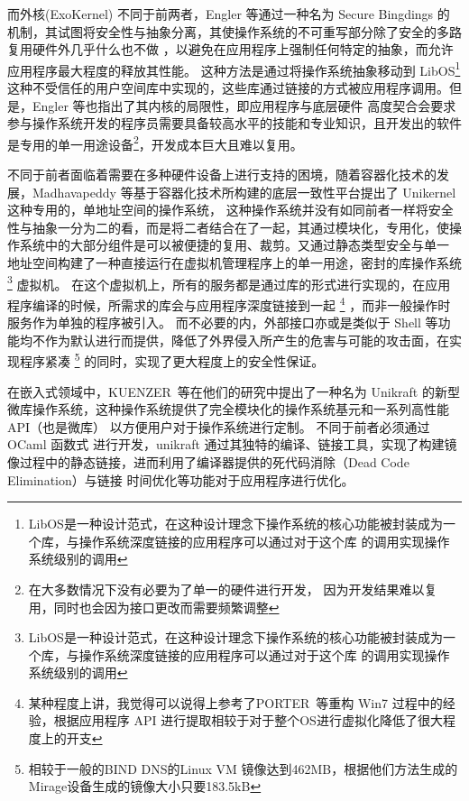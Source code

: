     而外核(ExoKernel) 不同于前两者，Engler 等通过一种名为 Secure Bingdings 的机制，其试图将安全性与抽象分离，其使操作系统的不可重写部分除了安全的多路复用硬件外几乎什么也不做
    ，以避免在应用程序上强制任何特定的抽象，而允许应用程序最大程度的释放其性能。
    这种方法是通过将操作系统抽象移动到 LibOS\footnote{LibOS是一种设计范式，在这种设计理念下操作系统的核心功能被封装成为一个库，与操作系统深度链接的应用程序可以通过对于这个库
    的调用实现操作系统级别的调用}
     这种不受信任的用户空间库中实现的，这些库通过链接的方式被应用程序调用。但是，Engler 等也指出了其内核的局限性，即应用程序与底层硬件
    高度契合会要求参与操作系统开发的程序员需要具备较高水平的技能和专业知识，且开发出的软件是专用的单一用途设备\footnote{在大多数情况下没有必要为了单一的硬件进行开发，
    因为开发结果难以复用，同时也会因为接口更改而需要频繁调整}，开发成本巨大且难以复用。
    \cite{wikiosdev_exokernel, engler_exokernel_1998}

    不同于前者面临着需要在多种硬件设备上进行支持的困境，随着容器化技术的发展，Madhavapeddy 等基于容器化技术所构建的底层一致性平台提出了 Unikernel 这种专用的，单地址空间的操作系统，
    这种操作系统并没有如同前者一样将安全性与抽象一分为二的看，而是将二者结合在了一起，其通过模块化，专用化，使操作系统中的大部分组件是可以被便捷的复用、裁剪。又通过静态类型安全与单一
    地址空间构建了一种直接运行在虚拟机管理程序上的单一用途，密封的库操作系统\footnote{LibOS是一种设计范式，在这种设计理念下操作系统的核心功能被封装成为一个库，与操作系统深度链接的应用程序可以通过对于这个库
    的调用实现操作系统级别的调用} 虚拟机。
    在这个虚拟机上，所有的服务都是通过库的形式进行实现的，在应用程序编译的时候，所需求的库会与应用程序深度链接到一起
    \footnote{某种程度上讲，我觉得可以说得上参考了PORTER 等重构 Win7 过程中的经验，根据应用程序 API 进行提取相较于对于整个OS进行虚拟化降低了很大程度上的开支\cite{porter_rethinking_nodate}}
    ，而非一般操作时服务作为单独的程序被引入。
    而不必要的内，外部接口亦或是类似于 Shell 等功能均不作为默认进行而提供，降低了外界侵入所产生的危害与可能的攻击面，在实现程序紧凑
    \footnote{相较于一般的BIND DNS的Linux VM 镜像达到462MB，根据他们方法生成的Mirage设备生成的镜像大小只要183.5kB}
    的同时，实现了更大程度上的安全性保证。\cite{madhavapeddy_unikernels_nodate}

    在嵌入式领域中，KUENZER 等在他们的研究中提出了一种名为 Unikraft 的新型微库操作系统，这种操作系统提供了完全模块化的操作系统基元和一系列高性能 API（也是微库） 以方便用户对于操作系统进行定制。
    不同于前者必须通过 OCaml 函数式 进行开发，unikraft 通过其独特的编译、链接工具，实现了构建镜像过程中的静态链接，进而利用了编译器提供的死代码消除（Dead Code Elimination）与链接
    时间优化等功能对于应用程序进行优化。
    \cite{kuenzer_unikraft_2021}

